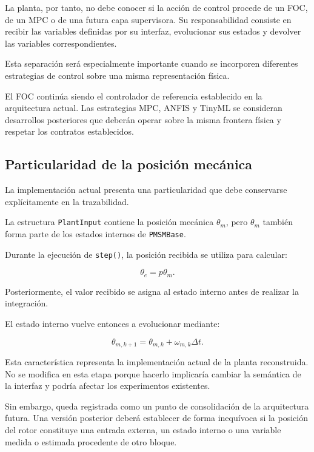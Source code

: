 La planta, por tanto, no debe conocer si la acción de control procede de un FOC, de un MPC o de una futura capa supervisora. Su responsabilidad consiste en recibir las variables definidas por su interfaz, evolucionar sus estados y devolver las variables correspondientes.

Esta separación será especialmente importante cuando se incorporen diferentes estrategias de control sobre una misma representación física.

El FOC continúa siendo el controlador de referencia establecido en la arquitectura actual. Las estrategias MPC, ANFIS y TinyML se consideran desarrollos posteriores que deberán operar sobre la misma frontera física y respetar los contratos establecidos.

\subsection{Particularidad de la posición mecánica}

La implementación actual presenta una particularidad que debe conservarse explícitamente en la trazabilidad.

La estructura \texttt{PlantInput} contiene la posición mecánica $\theta_m$, pero $\theta_m$ también forma parte de los estados internos de \texttt{PMSMBase}.

Durante la ejecución de \texttt{step()}, la posición recibida se utiliza para calcular:

\begin{equation}
\theta_e=p\theta_m.
\end{equation}

Posteriormente, el valor recibido se asigna al estado interno antes de realizar la integración.

El estado interno vuelve entonces a evolucionar mediante:

\begin{equation}
\theta_{m,k+1}
=
\theta_{m,k}
+
\omega_{m,k}\Delta t.
\end{equation}

Esta característica representa la implementación actual de la planta reconstruida. No se modifica en esta etapa porque hacerlo implicaría cambiar la semántica de la interfaz y podría afectar los experimentos existentes.

Sin embargo, queda registrada como un punto de consolidación de la arquitectura futura. Una versión posterior deberá establecer de forma inequívoca si la posición del rotor constituye una entrada externa, un estado interno o una variable medida o estimada procedente de otro bloque.

